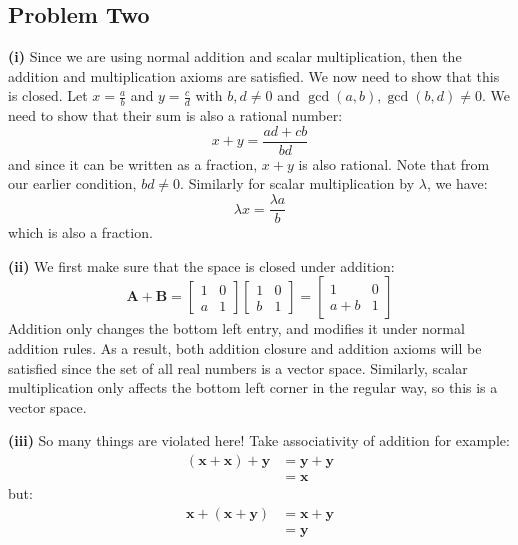 \documentclass{article}
\begin{document}
\subsection*{Problem Two}
\textbf{(i)} Since we are using normal addition and scalar multiplication, then the addition and multiplication axioms are satisfied. We now need to show that this is closed. Let $x=\frac{a}{b}$ and $y=\frac{c}{d}$ with $b,d \neq 0$ and $\gcd(a,b), \gcd(b,d) \neq 0$. We need to show that their sum is also a rational number:
\begin{equation}
    x+y = \frac{ad+cb}{bd}
\end{equation}
and since it can be written as a fraction, $x+y$ is also rational. Note that from our earlier condition, $bd\neq 0$. Similarly for scalar multiplication by $\lambda$, we have:
\begin{equation}
    \lambda x = \frac{\lambda a}{b}
\end{equation}
which is also a fraction.
\vspace{2mm}

\noindent \textbf{(ii)} We first make sure that the space is closed under addition:
\begin{equation}
    \bm{A} + \bm{B} =
    \begin{bmatrix}
    1 & 0 \\ 
    a & 1
    \end{bmatrix}
        \begin{bmatrix}
    1 & 0 \\ 
    b & 1
    \end{bmatrix}
    = 
    \begin{bmatrix}
    1 & 0 \\ 
    a+b & 1
    \end{bmatrix}
\end{equation}
Addition only changes the bottom left entry, and modifies it under normal addition rules. As a result, both addition closure and addition axioms will be satisfied since the set of all real numbers is a vector space. Similarly, scalar multiplication only affects the bottom left corner in the regular way, so this is a vector space.
\vspace{2mm}

\noindent  \textbf{(iii)} So many things are violated here! Take associativity of addition for example:
\begin{align}
    (\bm{x} + \bm{x}) + \bm{y} &= \bm{y} + \bm{y} \\ 
    &= \bm{x}
\end{align}
but:
\begin{align}
    \bm{x} + (\bm{x}+\bm{y}) &= \bm{x} + \bm{y} \\ 
    &= \bm{y}
\end{align}
\end{document}
